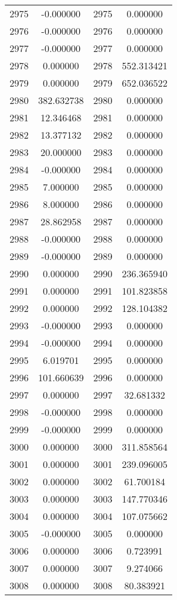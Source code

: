\documentclass[12pt]{article}
\begin{document}
\begin{longtable}{@{}cccc@{}}
2975 & -0.000000 & 2975 & 0.000000 \\
2976 & -0.000000 & 2976 & 0.000000 \\
2977 & -0.000000 & 2977 & 0.000000 \\
2978 & 0.000000 & 2978 & 552.313421 \\
2979 & 0.000000 & 2979 & 652.036522 \\
2980 & 382.632738 & 2980 & 0.000000 \\
2981 & 12.346468 & 2981 & 0.000000 \\
2982 & 13.377132 & 2982 & 0.000000 \\
2983 & 20.000000 & 2983 & 0.000000 \\
2984 & -0.000000 & 2984 & 0.000000 \\
2985 & 7.000000 & 2985 & 0.000000 \\
2986 & 8.000000 & 2986 & 0.000000 \\
2987 & 28.862958 & 2987 & 0.000000 \\
2988 & -0.000000 & 2988 & 0.000000 \\
2989 & -0.000000 & 2989 & 0.000000 \\
2990 & 0.000000 & 2990 & 236.365940 \\
2991 & 0.000000 & 2991 & 101.823858 \\
2992 & 0.000000 & 2992 & 128.104382 \\
2993 & -0.000000 & 2993 & 0.000000 \\
2994 & -0.000000 & 2994 & 0.000000 \\
2995 & 6.019701 & 2995 & 0.000000 \\
2996 & 101.660639 & 2996 & 0.000000 \\
2997 & 0.000000 & 2997 & 32.681332 \\
2998 & -0.000000 & 2998 & 0.000000 \\
2999 & -0.000000 & 2999 & 0.000000 \\
3000 & 0.000000 & 3000 & 311.858564 \\
3001 & 0.000000 & 3001 & 239.096005 \\
3002 & 0.000000 & 3002 & 61.700184 \\
3003 & 0.000000 & 3003 & 147.770346 \\
3004 & 0.000000 & 3004 & 107.075662 \\
3005 & -0.000000 & 3005 & 0.000000 \\
3006 & 0.000000 & 3006 & 0.723991 \\
3007 & 0.000000 & 3007 & 9.274066 \\
3008 & 0.000000 & 3008 & 80.383921 \\

\end{longtable}
\end{document}
